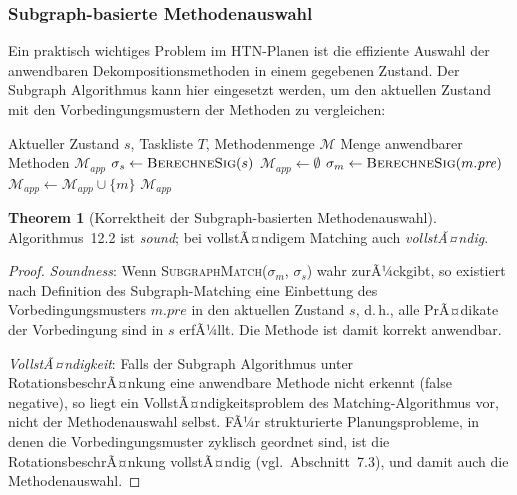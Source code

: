 ﻿\documentclass[a4paper,12pt]{article}
\theoremstyle{definition}
\newtheorem{theorem}{Theorem}[section]
\begin{document}
\subsubsection{Subgraph-basierte Methodenauswahl}

Ein praktisch wichtiges Problem im HTN-Planen ist die effiziente Auswahl der anwendbaren Dekompositionsmethoden in einem gegebenen Zustand. Der Subgraph Algorithmus kann hier eingesetzt werden, um den aktuellen Zustand mit den Vorbedingungsmustern der Methoden zu vergleichen:

\begin{algorithm}[H]
  \caption{Subgraph-basierte HTN-Methodenauswahl}
  \begin{algorithmic}[1]
    \Eingabe Aktueller Zustand $s$, Taskliste $T$, Methodenmenge $\mathcal{M}$
    \Ausgabe Menge anwendbarer Methoden $\mathcal{M}_{\mathit{app}}$
      \State $\sigma_s \gets \textsc{BerechneSig}(s)$ 
      \State $\mathcal{M}_{\mathit{app}} \gets \emptyset$
        \State $\sigma_m \gets \textsc{BerechneSig}(m.\mathit{pre})$
          \State $\mathcal{M}_{\mathit{app}} \gets \mathcal{M}_{\mathit{app}} \cup \{m\}$
        \EndeWenn
      \EndeFuer
      \State \Return $\mathcal{M}_{\mathit{app}}$
    \EndProzedur
  \end{algorithmic}
\end{algorithm}

{\sloppy\begin{theorem}[Korrektheit der Subgraph-basierten Methodenauswahl]
Algorithmus~12.2 ist \emph{sound}; bei vollstÃ¤ndigem Matching auch \emph{vollstÃ¤ndig}.
\end{theorem}}\par

\begin{proof}
\textit{Soundness}: Wenn \textsc{SubgraphMatch}($\sigma_m$, $\sigma_s$) wahr zurÃ¼ckgibt, so existiert nach Definition des Subgraph-Matching eine Einbettung des Vorbedingungsmusters $m.\mathit{pre}$ in den aktuellen Zustand $s$, d.\,h., alle PrÃ¤dikate der Vorbedingung sind in $s$ erfÃ¼llt. Die Methode ist damit korrekt anwendbar.

\textit{VollstÃ¤ndigkeit}: Falls der Subgraph Algorithmus unter RotationsbeschrÃ¤nkung eine anwendbare Methode nicht erkennt (false negative), so liegt ein VollstÃ¤ndigkeitsproblem des Matching-Algorithmus vor, nicht der Methodenauswahl selbst. FÃ¼r strukturierte Planungsprobleme, in denen die Vorbedingungsmuster zyklisch geordnet sind, ist die RotationsbeschrÃ¤nkung vollstÃ¤ndig (vgl.\ Abschnitt~7.3), und damit auch die Methodenauswahl.
\end{proof}
\end{document}
